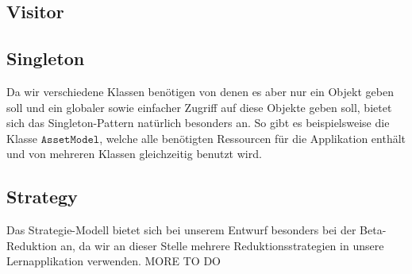 \subsection{Visitor}

\subsection{Singleton}
Da wir verschiedene Klassen benötigen von denen es aber nur ein Objekt geben soll und ein globaler sowie einfacher Zugriff auf diese Objekte geben soll, bietet sich das Singleton-Pattern natürlich besonders an. So gibt es beispielsweise die Klasse $\texttt{AssetModel}$, welche alle benötigten Ressourcen für die Applikation enthält und von mehreren Klassen gleichzeitig benutzt wird.

\subsection{Strategy}
Das Strategie-Modell bietet sich bei unserem Entwurf besonders bei der Beta-Reduktion an, da wir an dieser Stelle mehrere Reduktionsstrategien in unsere Lernapplikation verwenden.
MORE TO DO
